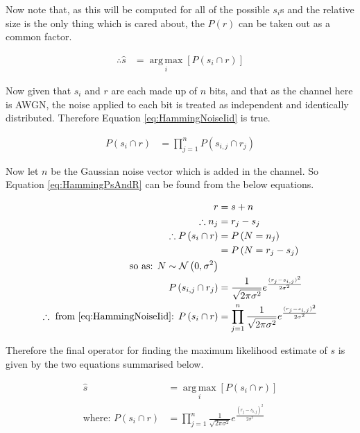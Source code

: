 \documentclass[12pt,onecolumn,letterpaper]{article}
\DeclareMathOperator*{\argmax}{arg\,max}
\begin{document}
Now note that, as this will be computed for all of the possible $s_i$s and the relative size is the only thing which is cared about, the $P\left(r\right)$ can be taken out as a common factor.

\begin{align}
   \therefore \hat{s} &= \underset{i}{\argmax}\left[P\left(s_i\cap r\right)\right] \nonumber
\end{align}

Now given that $s_i$ and $r$ are each made up of $n$ bits, and that as the channel here is AWGN, the noise applied to each bit is treated as independent and identically distributed. Therefore Equation \ref{eq:HammingNoiseIid} is true.

\begin{align}
   P\left(s_i\cap r\right) &= \prod_{j=1}^{n} P\left(s_{i,j}\cap r_j\right)
   \label{eq:HammingNoiseIid}
\end{align}

Now let $n$ be the Gaussian noise vector which is added in the channel. So Equation \ref{eq:HammingPsAndR} can be found from the below equations.

\begin{align}
   r &= s + n \nonumber\\
   \therefore n_j &= r_j - s_{j} \nonumber\\
   \therefore P\left(s_i\cap r\right) &= P\left(N=n_j\right) \nonumber\\
   &= P\left(N=r_j - s_j\right) \nonumber\\
   \mbox{so as: } N \sim \mathcal{N}\left( 0,\sigma^2\right) \nonumber\\
   P\left(s_{i,j}\cap r_j\right) &= \frac{1}{\sqrt{2\pi\sigma^2}}e^{\frac{(r_j - s_{i,j})^2}{2\sigma^2}} \nonumber\\
   \therefore \mbox{ from \ref{eq:HammingNoiseIid}: }P\left(s_i\cap r\right) &= \prod_{j=1}^{n} \frac{1}{\sqrt{2\pi\sigma^2}}e^{\frac{(r_j - s_{i,j})^2}{2\sigma^2}}
   \label{eq:HammingPsAndR}
\end{align}

Therefore the final operator for finding the maximum likelihood estimate of $s$ is given by the two equations summarised below.

\begin{subequations}
\begin{align}
   \hat{s} &= \underset{i}{\argmax}\left[P\left(s_i\cap r\right)\right] \label{eq:HammingFinalSHat}\\
   \mbox{where: } P\left(s_i\cap r\right) &= \prod_{j=1}^{n} \frac{1}{\sqrt{2\pi\sigma^2}}e^{\frac{(r_j - s_{i,j})^2}{2\sigma^2}}
\end{align}
\end{subequations}
\end{document}
